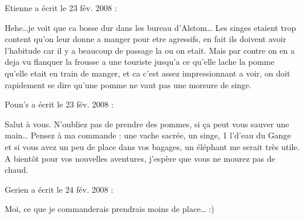 \medskip
Etienne a écrit le 23 fév. 2008 :
\begin{displayquote}
Hehe\dots je voit que ca bosse dur dans les bureau d'Alstom\dots
Les singes etaient trop content qu'on leur donne a manger pour etre agressifs, en fait ils doivent avoir l'habitude car il y a beaucoup de passage la ou on etait. Mais par contre on en a deja vu flanquer la frousse a une touriste jusqu'a ce qu'elle lache la pomme qu'elle etait en train de manger, et ca c'est assez impressionnant a voir, on doit rapidement se dire qu'une pomme ne vaut pas une morsure de singe.
\end{displayquote}

\medskip
Poun's a écrit le 23 fév. 2008 :
\begin{displayquote}
Salut à vous. N'oubliez pas de prendre des pommes, si ça peut vous sauver une main\dots
Pensez à ma commande : une vache sacrée, un singe, 1 l'd'eau du Gange et si vous avez un peu de place dans vos bagages, un éléphant me serait très utile.
A bientôt pour vos nouvelles aventures, j'espère que vous ne mourez pas de chaud.
\end{displayquote}

\medskip
Gerien a écrit le 24 fév. 2008 :
\begin{displayquote}
Moi, ce que je commanderais prendrais moins de place\dots
:)
\end{displayquote}

\vfill
